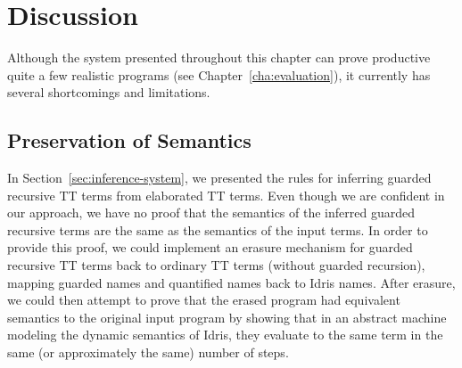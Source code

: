 





\section{Discussion}
\label{sec:discussion}
Although the system presented throughout this chapter can prove productive quite
a few realistic programs (see Chapter~\ref{cha:evaluation}), it currently has
several shortcomings and limitations.

\subsection{Preservation of Semantics}
\label{sec:pres-semant}
In Section~\ref{sec:inference-system}, we presented the rules for inferring
guarded recursive TT terms from elaborated TT terms. Even though we are
confident in our approach, we have no proof that the semantics of the inferred
guarded recursive terms are the same as the semantics of the input terms. In
order to provide this proof, we could implement an erasure mechanism for guarded
recursive TT terms back to ordinary TT terms (without guarded recursion),
mapping guarded names and quantified names back to Idris names. After erasure,
we could then attempt to prove that the erased program had equivalent semantics to the
original input program by showing that in an abstract machine modeling the
dynamic semantics of Idris, they evaluate to the same term in the same (or
approximately the same) number of steps.

